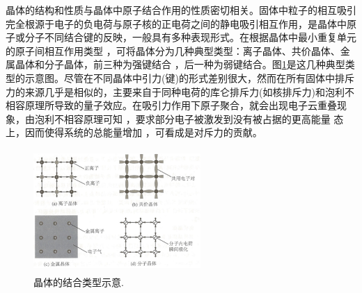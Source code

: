 晶体的结构和性质与晶体中原子结合作用的性质密切相关。固体中粒子的相互吸引完全根源于电子的负电荷与原子核的正电荷之间的静电吸引相互作用，是晶体中原子或分子不同结合键的反映，一般具有多种表现形式。在根据晶体中最小重复单元的原子间相互作用类型 ，可将晶体分为几种典型类型：离子晶体、共价晶体、金属晶体和分子晶体，前三种为强键结合 ，后一种为弱键结合。图\ref{Fig:SSI-05}是这几种典型类型的示意图。尽管在不同晶体中引力(键)的形式差别很大，然而在所有固体中排斥力的来源几乎是相似的，主要来自于同种电荷的库仑排斥力(如核排斥力)和泡利不相容原理所导致的量子效应。在吸引力作用下原子聚合，就会出现电子云重叠现象，由泡利不相容原理可知 ，要求部分电子被激发到没有被占据的更高能量 态上，因而使得系统的总能量增加 ，可看成是对斥力的贡献。
\begin{figure}[h!]
\centering
\vspace*{-0.1in}
\includegraphics[height=1.85in,width=2.5in,viewport=0 0 90 70,clip]{Figures/Four_Crystal-type.png}
\caption{\small \textrm{晶体的结合类型示意.}}%
\label{Fig:SSI-05}
\end{figure}

